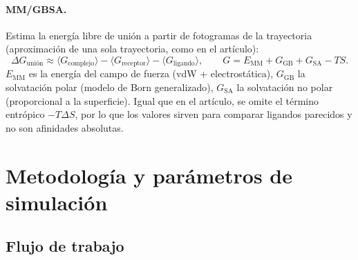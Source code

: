 \documentclass[11pt,a4paper]{article}
\begin{document}
\paragraph{MM/GBSA.} Estima la energía libre de unión a partir de fotogramas de la trayectoria
(aproximación de una sola trayectoria, como en el artículo):
\begin{equation}
\Delta G_{\text{unión}} \approx \langle G_{\text{complejo}}\rangle-\langle G_{\text{receptor}}\rangle-\langle G_{\text{ligando}}\rangle,\qquad
G = E_{\text{MM}} + G_{\text{GB}} + G_{\text{SA}} - TS .
\end{equation}
$E_{\text{MM}}$ es la energía del campo de fuerza (vdW + electrostática), $G_{\text{GB}}$ la solvatación
polar (modelo de Born generalizado), $G_{\text{SA}}$ la solvatación no polar (proporcional a la
superficie). Igual que en el artículo, se omite el término entrópico $-T\Delta S$, por lo que los valores
sirven para comparar ligandos parecidos y no son afinidades absolutas.

\section{Metodología y parámetros de simulación}

\subsection{Flujo de trabajo}
\end{document}
